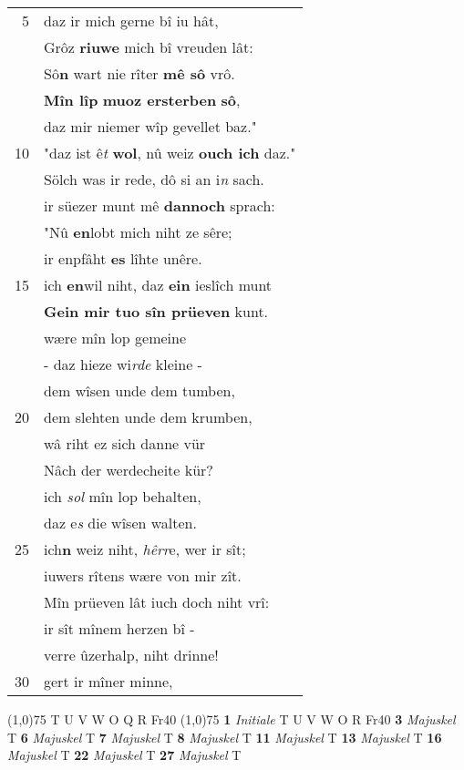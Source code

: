 \documentclass[8pt,a4paper,notitlepage]{article}
\begin{document}
\begin{table}[ht]
\begin{minipage}[t]{0.5\linewidth}
\begin{tabular}{rl}
5 & daz ir mich gerne bî iu hât,\\ 
 & Grôz \textbf{riuwe} mich bî vreuden lât:\\ 
 & Sô\textbf{n} wart nie rîter \textbf{mê sô} vrô.\\ 
 & \textbf{Mîn lîp} \textbf{muoz ersterben} \textbf{sô},\\ 
 & daz mir niemer wîp gevellet baz."\\ 
10 & "daz ist ê\textit{t} \textbf{wol}, nû weiz \textbf{ouch ich} daz."\\ 
 & Sölch was ir rede, dô si an i\textit{n} sach.\\ 
 & ir süezer munt mê \textbf{dannoch} sprach:\\ 
 & "Nû \textbf{en}lobt mich niht ze sêre;\\ 
 & ir enpfâht \textbf{es} lîhte unêre.\\ 
15 & ich \textbf{en}wil niht, daz \textbf{ein} ieslîch munt\\ 
 & \textbf{Gein mir tuo sîn prüeven} kunt.\\ 
 & wære mîn lop gemeine\\ 
 & - daz hieze wi\textit{rde} kleine -\\ 
 & dem wîsen unde dem tumben,\\ 
20 & dem slehten unde dem krumben,\\ 
 & wâ riht ez sich danne vür\\ 
 & Nâch der werdecheite kür?\\ 
 & ich \textit{sol} mîn lop behalten,\\ 
 & daz e\textit{s} die wîsen walten.\\ 
25 & ich\textbf{n} weiz niht, \textit{hêrr}e, wer ir sît;\\ 
 & iuwers rîtens wære von mir zît.\\ 
 & Mîn prüeven lât iuch doch niht vrî:\\ 
 & ir sît mînem herzen bî -\\ 
 & verre ûzerhalp, niht drinne!\\ 
30 & gert ir mîner minne,\\ 
\end{tabular}
\scriptsize
\line(1,0){75} \newline
T U V W O Q R Fr40 \newline
\line(1,0){75} \newline
\textbf{1} \textit{Initiale} T U V W O R Fr40  \textbf{3} \textit{Majuskel} T  \textbf{6} \textit{Majuskel} T  \textbf{7} \textit{Majuskel} T  \textbf{8} \textit{Majuskel} T  \textbf{11} \textit{Majuskel} T  \textbf{13} \textit{Majuskel} T  \textbf{16} \textit{Majuskel} T  \textbf{22} \textit{Majuskel} T  \textbf{27} \textit{Majuskel} T  \newline

\end{minipage}
\end{table}
\end{document}
